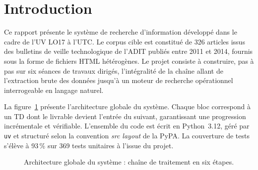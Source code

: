 \chapter*{Introduction}

Ce rapport présente le système de recherche d'information développé dans le cadre de
l'UV LO17 à l'UTC. Le corpus cible est constitué de 326 articles issus des bulletins
de veille technologique de l'ADIT publiés entre 2011 et 2014, fournis sous la forme
de fichiers HTML hétérogènes. Le projet consiste à construire, pas à pas sur six séances
de travaux dirigés, l'intégralité de la chaîne allant de l'extraction brute des données
jusqu'à un moteur de recherche opérationnel interrogeable en langage naturel.

La figure~\ref{fig:pipeline_global} présente l'architecture globale du système. Chaque
bloc correspond à un TD dont le livrable devient l'entrée du suivant, garantissant une
progression incrémentale et vérifiable. L'ensemble du code est écrit en Python~3.12,
géré par \texttt{uv} et structuré selon la convention \emph{src layout} de la PyPA.
La couverture de tests s'élève à 93\,\% sur 369 tests unitaires à l'issue du projet.

\begin{figure}[ht]
  \centering
  \caption{Architecture globale du système : chaîne de traitement en six étapes.}
  \label{fig:pipeline_global}
\end{figure}
